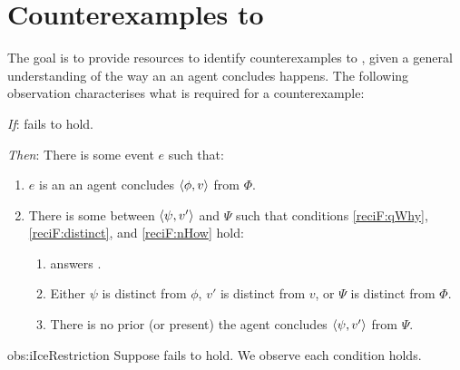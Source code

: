 \section*{Counterexamples to \issueInclusion{}}


\begin{note}
  The goal is to provide resources to identify counterexamples to \issueInclusion{}, given a general understanding of the way an  an agent concludes happens.
  The following observation characterises what is required for a counterexample:

  \begin{observation}%
    \label{obs:iIceRestriction}%
    \vspace{-\baselineskip}
    \begin{itenum}
    \item[\emph{If}:]
      \issueInclusion{} fails to hold.
    \item[\emph{Then}:]
      There is some event \(e\) such that:
      \begin{enumerate}
      \item
        \(e\) is an  an agent concludes \(\langle\phi, v\rangle\) from \(\Phi\).
      \item
        There is some \fofr{} between \(\langle\psi, v'\rangle\) and \(\Psi\) such that conditions \ref{reciF:qWhy}, \ref{reciF:distinct}, and \ref{reciF:nHow} hold:
        \begin{enumerate}[label=\Alph*., ref=\Alph*]
        \item
          \label{reciF:qWhy}
           answers \qWhy{}.
        \item
          \label{reciF:distinct}
          Either \(\psi\) is distinct from \(\phi\), \(v'\) is distinct from \(v\), or \(\Psi\) is distinct from \(\Phi\).
        \item
          \label{reciF:nHow}
          There is no prior (or present)  the agent concludes \(\langle\psi, v'\rangle\) from \(\Psi\).
        \end{enumerate}
      \end{enumerate}
    \end{itenum}
    \vspace{-1.5\baselineskip}
  \end{observation}
  \begin{motivation}{obs:iIceRestriction}
    Suppose \issueInclusion{} fails to hold.
    We observe each condition holds.


\end{motivation}
\end{note}
